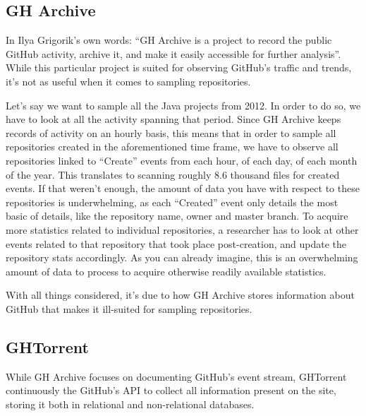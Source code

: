 \subsection{GH Archive}

In Ilya Grigorik's own words: ``GH Archive is a project to record the public GitHub activity, archive it, and make it easily accessible for further analysis''. %
While this particular project is suited for observing GitHub's traffic and trends, it's not as useful when it comes to sampling repositories.

Let's say we want to sample all the Java projects from 2012.
In order to do so, we have to look at all the activity spanning that period.
Since GH Archive keeps records of activity on an hourly basis, this means that in order to sample all repositories created in the aforementioned time frame, we have to observe all repositories linked to ``Create'' events from each hour, of each day, of each month of the year.
This translates to scanning roughly 8.6 thousand files for created events.
If that weren't enough, the amount of data you have with respect to these repositories is underwhelming, as each ``Created'' event only details the most basic of details, like the repository name, owner and master branch.
To acquire more statistics related to individual repositories, a researcher has to look at other events related to that repository that took place post-creation, and update the repository stats accordingly.
As you can already imagine, this is an overwhelming amount of data to process to acquire otherwise readily available statistics.

With all things considered, it's due to how GH Archive stores information about GitHub that makes it ill-suited for sampling repositories.

\subsection{GHTorrent}

While GH Archive focuses on documenting GitHub's event stream, GHTorrent continuously the GitHub's API to collect all information present on the site, storing it both in relational and non-relational databases. %
